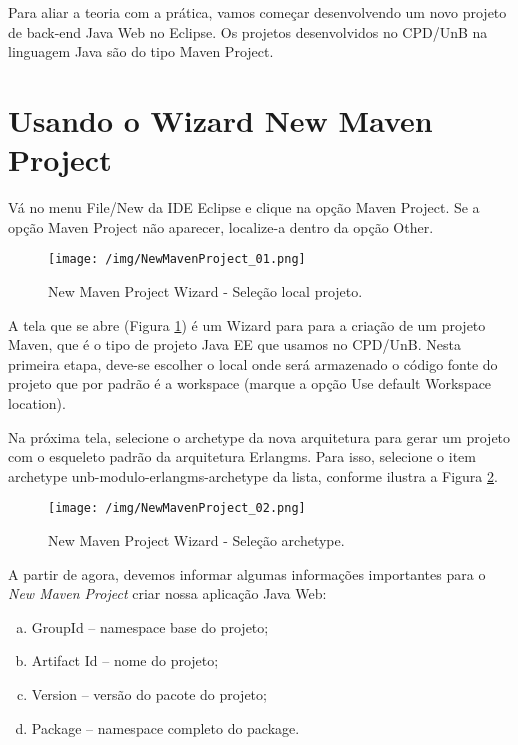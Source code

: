 Para aliar a teoria com a prática, vamos 
começar desenvolvendo um novo projeto de 
back-end Java Web no Eclipse. Os projetos desenvolvidos no CPD/UnB 
na linguagem Java são do tipo Maven Project.

\section{Usando o Wizard New Maven Project}

Vá no menu File/New da IDE Eclipse e clique na opção 
Maven Project. Se a opção Maven Project não aparecer, localize-a dentro da opção Other.

\begin{figure}[htb]
\centering
\texttt{[image: /img/NewMavenProject\_01.png]}
\caption{New Maven Project Wizard - Seleção local projeto.}
\label{fig_new_maven_project_01}
\end{figure}
\FloatBarrier

A tela que se abre (Figura \ref{fig_new_maven_project_01}) 
é um Wizard para para a criação de um projeto Maven, que é o tipo de projeto
Java EE que usamos no CPD/UnB. Nesta primeira etapa, deve-se escolher 
o local onde será armazenado o código fonte do projeto que por padrão
é a workspace (marque a opção Use default Workspace location).

Na próxima tela, selecione o archetype da nova arquitetura para gerar
um projeto com o esqueleto padrão da arquitetura Erlangms. Para isso, 
selecione o item archetype unb-modulo-erlangms-archetype da lista, 
conforme ilustra a Figura \ref{fig_new_maven_project_02}.

\begin{figure}[htb]
\centering
\texttt{[image: /img/NewMavenProject\_02.png]}
\caption{New Maven Project Wizard - Seleção archetype.}
\label{fig_new_maven_project_02}
\end{figure}
\FloatBarrier

A partir de agora, devemos informar algumas informações importantes 
para o \textit{New Maven Project} criar nossa aplicação Java Web:

\begin{enumerate}[(a)]
   \item{GroupId} -- namespace base do projeto;
   \item{Artifact Id} -- nome do projeto;
   \item{Version} -- versão do pacote do projeto;
   \item{Package} -- namespace completo do package.
\end{enumerate}
  

